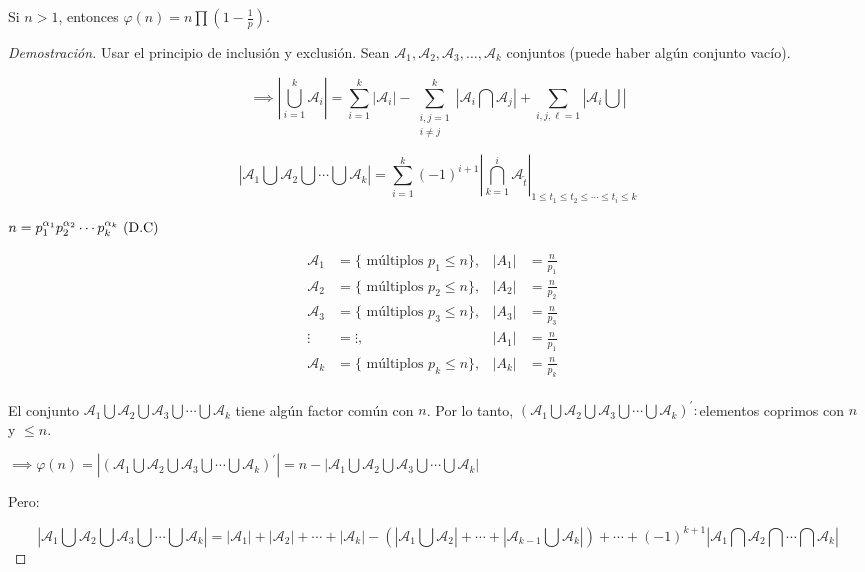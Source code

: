 \begin{theorem}
Si $n>1$, entonces $\displaystyle\varphi(n)=n\prod\left(1-\frac{1}{p}\right)$.
\begin{proof}[Demostración]
Usar el principio de inclusión y exclusión. Sean $\mathcal{A}_1,\mathcal{A}_2,\mathcal{A}_3,\ldots,\mathcal{A}_k$ conjuntos (puede haber algún conjunto vacío).

\[\displaystyle\implies\left|\bigcup^{k}_{i=1}\mathcal{A}_{i}\right|=\sum_{i=1}^{k}\left|\mathcal{A}_i\right|-\sum_{\substack{i,j=1\\i\neq j}}^{k}\left|\mathcal{A}_{i}\bigcap\mathcal{A}_{j}\right|+\sum_{i,j,\ell=1}\left|\mathcal{A}_i\bigcup\right| \]

\[\left|\mathcal{A}_1\bigcup\mathcal{A}_2\bigcup\cdots\bigcup\mathcal{A}_k\right|=\sum_{i=1}^{k}{(-1)}^{i+1}{\left|\bigcap_{k=1}^{i}\mathcal{A}_{\tilde{t}}\right|}_{1\leq t_1\leq t_2\leq\cdots\leq t_i\leq k}\]

$n={p}^{\alpha_1}_{1}{p}^{\alpha_2}_{2}\cdots{p}^{\alpha_k}_{k}\text{ (D.C)}$

\begin{align*}
\mathcal{A}_1 &= \{\text{ múltiplos }p_1\leq n \}, &|A_1|&=\frac{n}{p_1}&\\
\mathcal{A}_2 &= \{\text{ múltiplos }p_2\leq n \}, &|A_2|&=\frac{n}{p_2}&\\
\mathcal{A}_3 &= \{\text{ múltiplos }p_3\leq n \}, &|A_3|&=\frac{n}{p_3}&\\
\vdots &= \vdots,&|A_1|&=\frac{n}{p_1}&\\
\mathcal{A}_k &=\{ \text{ múltiplos }p_k\leq n \}, &|A_k|&=\frac{n}{p_k}&\\
\end{align*}

El conjunto $\mathcal{A}_1\bigcup\mathcal{A}_2\bigcup\mathcal{A}_3\bigcup\cdots\bigcup\mathcal{A}_k$ tiene algún factor común con $n$. Por lo tanto,  ${\left(\mathcal{A}_1\bigcup\mathcal{A}_2\bigcup\mathcal{A}_3\bigcup\cdots\bigcup\mathcal{A}_k\right)}^{\prime}\colon$elementos coprimos con $n$ y $\leq n$.

$\implies \varphi(n)=\left|{\left(\mathcal{A}_1\bigcup\mathcal{A}_2\bigcup\mathcal{A}_3\bigcup\cdots\bigcup\mathcal{A}_k\right)}^{\prime}\right|=n-\left|\mathcal{A}_1\bigcup\mathcal{A}_2\bigcup\mathcal{A}_3\bigcup\cdots\bigcup\mathcal{A}_k\right|$

Pero:

\[\left|\mathcal{A}_1\bigcup\mathcal{A}_2\bigcup\mathcal{A}_3\bigcup\cdots\bigcup\mathcal{A}_k\right|=|\mathcal{A}_1|+|\mathcal{A}_2|+\cdots+|\mathcal{A}_k|-\left(\left|\mathcal{A}_1\bigcup\mathcal{A}_2\right|+\cdots+\left|\mathcal{A}_{k-1}\bigcup\mathcal{A}_k\right|\right)+\cdots+{(-1)}^{k+1}\left|\mathcal{A}_1\bigcap\mathcal{A}_2\bigcap\cdots\bigcap\mathcal{A}_k\right|
\]


\end{proof}
\end{theorem}
